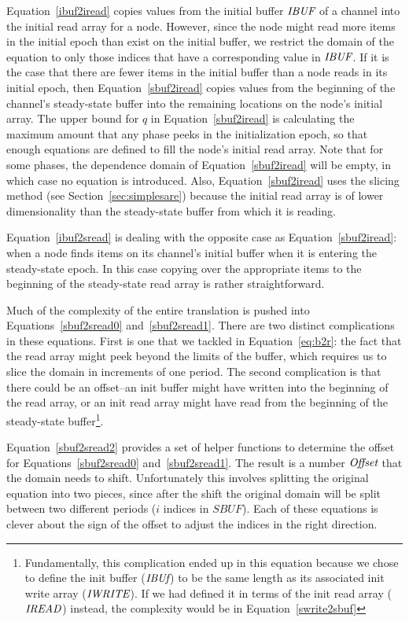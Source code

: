 Equation~\ref{ibuf2iread} copies values from the initial buffer
$\mbox{\it IBUF}$ of a channel into the initial read array for a node.
However, since the node might read more items in the initial epoch
than exist on the initial buffer, we restrict the domain of the
equation to only those indices that have a corresponding value in
$\mbox{\it IBUF}$.  If it is the case that there are fewer items in the
initial buffer than a node reads in its initial epoch, then
Equation~\ref{sbuf2iread} copies values from the beginning of the
channel's steady-state buffer into the remaining locations on the
node's initial array.  The upper bound for $q$ in
Equation~\ref{sbuf2iread} is calculating the maximum amount that any
phase peeks in the initialization epoch, so that enough equations are
defined to fill the node's initial read array.  Note that for some
phases, the dependence domain of Equation~\ref{sbuf2iread} will be
empty, in which case no equation is introduced.  Also,
Equation~\ref{sbuf2iread} uses the slicing method (see
Section~\ref{sec:simplesare}) because the initial read array is of
lower dimensionality than the steady-state buffer from which it is
reading.

Equation~\ref{ibuf2sread} is dealing with the opposite case as
Equation~\ref{sbuf2iread}: when a node finds items on its channel's
initial buffer when it is entering the steady-state epoch.  In this
case copying over the appropriate items to the beginning of the
steady-state read array is rather straightforward.

Much of the complexity of the entire translation is pushed into
Equations~\ref{sbuf2sread0} and~\ref{sbuf2sread1}.  There are two
distinct complications in these equations.  First is one that we
tackled in Equation~\ref{eq:b2r}: the fact that the read array might
peek beyond the limits of the buffer, which requires us to slice the
domain in increments of one period.  The second complication is that
there could be an offset--an init buffer might have written into the
beginning of the read array, or an init read array might have read
from the beginning of the steady-state buffer\footnote{Fundamentally,
this complication ended up in this equation because we chose to define
the init buffer ($\mbox{\it IBUf}$) to be the same length as its associated
init write array ($\mbox{\it IWRITE}$).  If we had defined it in terms of
the init read array ($\mbox{\it IREAD}$) instead, the complexity would be in
Equation~\ref{swrite2sbuf}}.

Equation~\ref{sbuf2sread2} provides a set of helper functions to
determine the offset for Equations~\ref{sbuf2sread0}
and~\ref{sbuf2sread1}.  The result is a number $\mbox{\it Offset}$ that the
domain needs to shift.  Unfortunately this involves splitting the
original equation into two pieces, since after the shift the original
domain will be split between two different periods ($i$ indices in
$SBUF$).  Each of these equations is clever about the sign of the
offset to adjust the indices in the right direction.